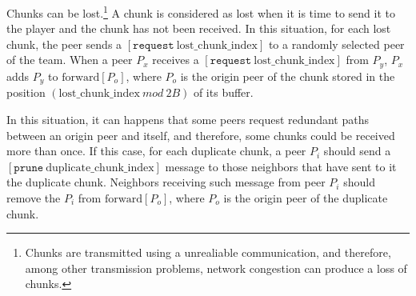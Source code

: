 
\label{sec:overlay_organization}

Chunks can be lost.\footnote{Chunks are transmitted using a
  unrealiable communication, and therefore, among other transmission
  problems, network congestion can produce a loss of chunks.} A chunk
is considered as lost when it is time to send it to the player and the
chunk has not been received.  In this situation, for each lost chunk,
the peer sends a $[\mathtt{request}~\text{lost\_chunk\_index}]$ to a
randomly selected peer of the team. When a peer $P_x$ receives a
$[\mathtt{request}~\text{lost\_chunk\_index}]$ from $P_y$, $P_x$ adds
$P_y$ to $\text{forward}[P_o]$, where $P_o$ is the origin peer of the
chunk stored in the position
$(\text{lost\_chunk\_index}~\mathit{mod}~2B)$ of its buffer.

\begin{comment}
origin peer of the next chunk stored in the
buffer. This peer has to characteristics: (1) it is not necessary a
neighbor peer, and (2) there is a high probability that this chunk has
been stored in the buffer ``for a long time'', so, if it is not a
neighbor, the link between it and the peer is working fairly well.
\end{comment}

  
In this situation, it can happens that some peers request
redundant paths between an origin peer and itself, and therefore, some
chunks could be received more than once. If this case, for each
duplicate chunk, a peer $P_i$ should send a $[\mathtt{prune}~\text{duplicate\_chunk\_index}]$ message to those neighbors that
have sent to it the duplicate chunk. Neighbors receiving such message
from peer $P_i$ should remove the $P_i$ from $\text{forward}[P_o]$,
where $P_o$ is the origin peer of the duplicate chunk.

